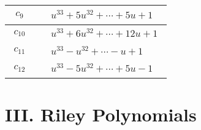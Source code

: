 \documentclass[1p]{elsarticle_modified}
\theoremstyle{definition}
\begin{document}
\begin{tabular}{m{50pt}|m{274pt}}
\hline $$\begin{aligned}c_{9}\end{aligned}$$&$\begin{aligned}
&u^{33}+5 u^{32}+\cdots+5 u+1
\end{aligned}$\\
\hline $$\begin{aligned}c_{10}\end{aligned}$$&$\begin{aligned}
&u^{33}+6 u^{32}+\cdots+12 u+1
\end{aligned}$\\
\hline $$\begin{aligned}c_{11}\end{aligned}$$&$\begin{aligned}
&u^{33}- u^{32}+\cdots- u+1
\end{aligned}$\\
\hline $$\begin{aligned}c_{12}\end{aligned}$$&$\begin{aligned}
&u^{33}-5 u^{32}+\cdots+5 u-1
\end{aligned}$\\
\hline
\end{tabular}\newpage\renewcommand{\arraystretch}{1}
\centering \section*{ III. Riley Polynomials}
\end{document}
